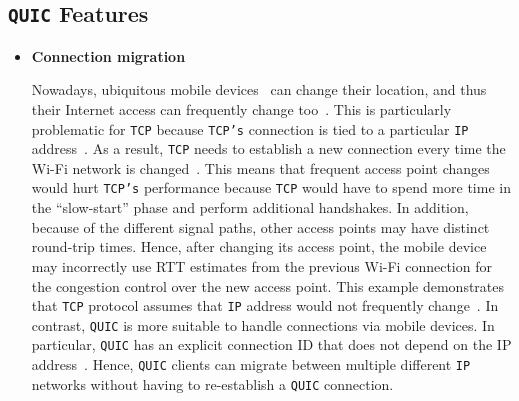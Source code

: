 \documentclass[12pt,a4paper,twoside,openright]{report}
\begin{document}
\subsection{\texttt{QUIC} Features} \label{QUIC_features}
\begin{itemize}


 \item \textbf{Connection migration} 
 
    Nowadays, ubiquitous mobile devices~\cite{bib_number_of_mobile_users} can change their location, and thus their Internet access can frequently change too~\cite{PollardBarry2019HiAP}.
    This is particularly problematic for \texttt{TCP} because \texttt{TCP's} connection is tied to a particular \texttt{IP} address~\cite{PollardBarry2019HiAP}.
    As a result, \texttt{TCP} needs to establish a new connection every time the Wi-Fi network is changed~\cite{PollardBarry2019HiAP}.
    This means that frequent access point changes would hurt \texttt{TCP's} performance because \texttt{TCP} would have to spend more time in the \enquote{slow-start} phase and perform additional handshakes.
    In addition, because of the different signal paths, other access points may have distinct round-trip times.
    Hence, after changing its access point, the mobile device may incorrectly use RTT estimates from the previous Wi-Fi connection for the congestion control over the new access point.
    This example demonstrates that \texttt{TCP} protocol assumes that \texttt{IP} address would not frequently change~\cite{PollardBarry2019HiAP}.
    In contrast, \texttt{QUIC} is more suitable to handle connections via mobile devices.
    In particular, \texttt{QUIC} has an explicit connection ID that does not depend on the IP address~\cite{PollardBarry2019HiAP}.
    Hence, \texttt{QUIC} clients can migrate between multiple different \texttt{IP} networks without having to re-establish a \texttt{QUIC} connection.
    
    
    






\end{itemize}
\end{document}
